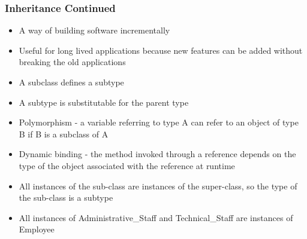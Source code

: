\documentclass[t,12pt,numbers,fleqn,handout]{beamer}
\begin{document}

\begin{frame}
\frametitle{Inheritance Continued}

\begin{itemize}
\item A way of building software incrementally
\item Useful for long lived applications because new features can be added without breaking the old applications
\item A subclass defines a subtype
\item A subtype is substitutable for the parent type
\item Polymorphism - a variable referring to type A can refer to an object of type B if B is a subclass of A
\item Dynamic binding - the method invoked through a reference depends on the type of the object associated with the
reference at runtime
\item All instances of the sub-class are instances of the super-class, so the type of the sub-class is a subtype
\item All instances of Administrative\_Staff and Technical\_Staff are instances of Employee
\end{itemize}
\end{frame}





\end{document}
